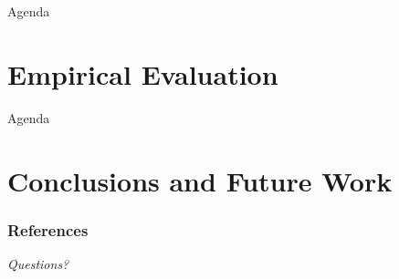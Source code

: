 \documentclass{beamer}
\begin{document}
  

  \begin{frame}{Agenda}
    \section{Empirical Evaluation}
    \tableofcontents[currentsection]
  \end{frame}

  


  \begin{frame}{Agenda}
    \section{Conclusions and Future Work}
    \tableofcontents[currentsection]
  \end{frame}

  

  \begin{frame}[allowframebreaks]
    \frametitle{References}
    
    
  \end{frame}

  \begin{frame}
    \centering \Huge
    \emph{Questions?}
  \end{frame}  
  
  

  
\end{document}
